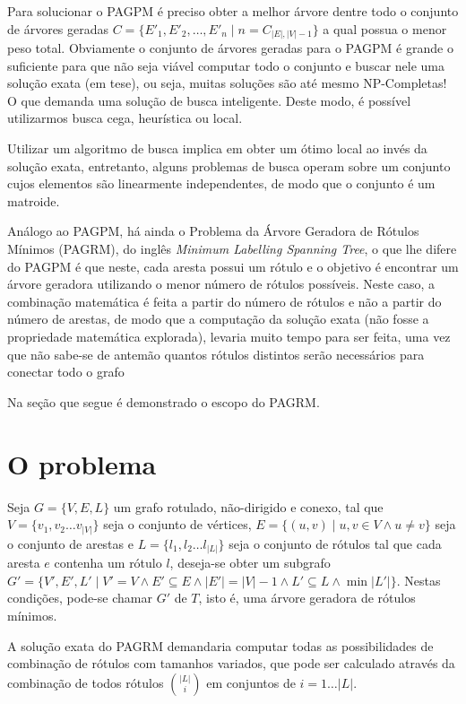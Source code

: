 \documentclass[12pt]{article}
\begin{document}
	Para solucionar o PAGPM é preciso obter a melhor árvore dentre todo o conjunto de árvores geradas $C = \{E'_1, E'_2, \dots, E'_n \mid n = C_{|E|,|V|-1}\}$ a qual possua o menor peso total. Obviamente o conjunto de árvores geradas para o PAGPM é grande o suficiente para que não seja viável computar todo o conjunto e buscar nele uma solução exata (em tese), ou seja, muitas soluções são até mesmo NP-Completas! O que demanda uma solução de busca inteligente. Deste modo, é possível utilizarmos busca cega, heurística ou local.

	Utilizar um algoritmo de busca implica em obter um ótimo local ao invés da solução exata, entretanto, alguns problemas de busca operam sobre um conjunto cujos elementos são linearmente independentes, de modo que o conjunto é um matroide.
	
	Análogo ao PAGPM, há ainda o Problema da Árvore Geradora de Rótulos Mínimos (PAGRM), do inglês \textit{Minimum Labelling Spanning Tree}, o que lhe difere do PAGPM é que neste, cada aresta possui um rótulo e o objetivo é encontrar um árvore geradora utilizando o menor número de rótulos possíveis. Neste caso, a combinação matemática é feita a partir do número de rótulos e não a partir do número de arestas, de modo que a computação da solução exata (não fosse a propriedade matemática explorada), levaria muito tempo para ser feita, uma vez que não sabe-se de antemão quantos rótulos distintos serão necessários para conectar todo o grafo

	Na seção que segue é demonstrado o escopo do PAGRM.	

\section{O problema}\label{sec:problema}

	Seja $G = \{V, E, L\}$ um grafo rotulado, não-dirigido e conexo, tal que $V = \{v_1, v_2 \dots v_{|V|}\}$ seja o conjunto de vértices, $E = \{(u, v) \mid u, v \in V \wedge u \neq v\}$ seja o conjunto de arestas e $L = \{l_1, l_2 \dots l_{|L|}\}$ seja o conjunto de rótulos tal que cada aresta $e$ contenha um rótulo $l$, deseja-se obter um subgrafo $G' = \{V', E', L' \mid V' = V \wedge E' \subseteq E \wedge |E'| = |V| - 1 \wedge L' \subseteq L \wedge \min|L'|\}$. Nestas condições, pode-se chamar $G'$ de $T$, isto é, uma árvore geradora de rótulos mínimos.

	A solução exata do PAGRM demandaria computar todas as possibilidades de combinação de rótulos com tamanhos variados, que pode ser calculado através da combinação de todos rótulos $\displaystyle{|L| \choose i}$ em conjuntos de $i = 1 \dots |L|$.
\end{document}
